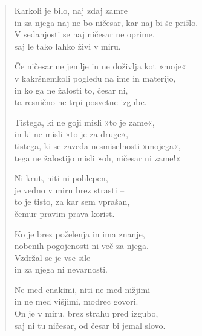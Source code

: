 \clearpage
\begin{verse}

Karkoli je bilo, naj zdaj zamre\\
in za njega naj ne bo ničesar, kar naj bi še prišlo.\\
V sedanjosti se naj ničesar ne oprime,\\
saj le tako lahko živi v miru.

Če ničesar ne jemlje in ne doživlja kot »moje«\\
v kakršnemkoli pogledu na ime in materijo,\\
in ko ga ne žalosti to, česar ni,\\
ta resnično ne trpi posvetne izgube.

Tistega, ki ne goji misli »to je zame«,\\
in ki ne misli »to je za druge«,\\
tistega, ki se zaveda nesmiselnosti »mojega«,\\
tega ne žalostijo misli »oh, ničesar ni zame!«

Ni krut, niti ni pohlepen,\\
je vedno v miru brez strasti --\\
to je tisto, za kar sem vprašan,\\
čemur pravim prava korist.

Ko je brez poželenja in ima znanje,\\
nobenih pogojenosti ni več za njega.\\
Vzdržal se je vse sile\\
in za njega ni nevarnosti.

Ne med enakimi, niti ne med nižjimi\\
in ne med višjimi, modrec govori.\\
On je v miru, brez strahu pred izgubo,\\
saj ni tu ničesar, od česar bi jemal slovo.

\end{verse}

